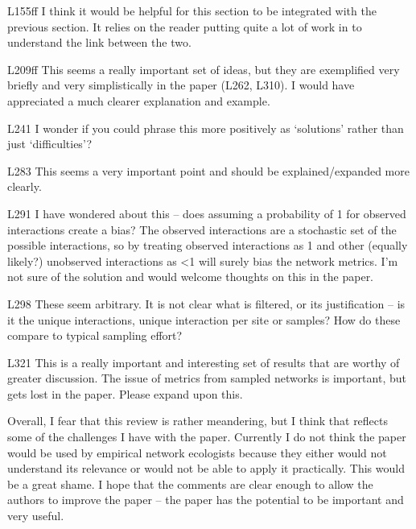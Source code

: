 L155ff I think it would be helpful for this section to be integrated with the previous section. It relies on the reader putting quite a lot of work in to understand the link between the two.

L209ff This seems a really important set of ideas, but they are exemplified very briefly and very simplistically in the paper (L262, L310). I would have appreciated a much clearer explanation and example.

L241 I wonder if you could phrase this more positively as ‘solutions’ rather than just ‘difficulties’?

L283 This seems a very important point and should be explained/expanded more clearly.

L291 I have wondered about this – does assuming a probability of 1 for observed interactions create a bias? The observed interactions are a stochastic set of the possible interactions, so by treating observed interactions as 1 and other (equally likely?) unobserved interactions as <1 will surely bias the network metrics. I’m not sure of the solution and would welcome thoughts on this in the paper.

L298 These seem arbitrary. It is not clear what is filtered, or its justification – is it the unique interactions, unique interaction per site or samples? How do these compare to typical sampling effort?

L321 This is a really important and interesting set of results that are worthy of greater discussion. The issue of metrics from sampled networks is important, but gets lost in the paper. Please expand upon this.

Overall, I fear that this review is rather meandering, but I think that reflects some of the challenges I have with the paper. Currently I do not think the paper would be used by empirical network ecologists because they either would not understand its relevance or would not be able to apply it practically. This would be a great shame. I hope that the comments are clear enough to allow the authors to improve the paper – the paper has the potential to be important and very useful.